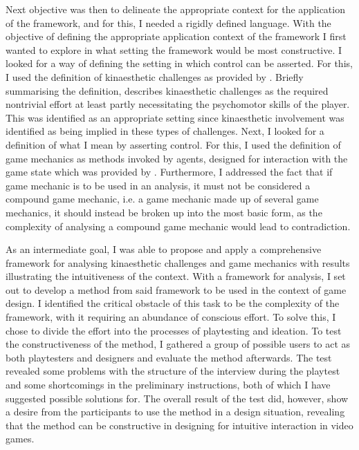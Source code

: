 Next objective was then to delineate the appropriate context for the application of the framework, and for this, I needed a rigidly defined language. With the objective of defining the appropriate application context of the framework I first wanted to explore in what setting the framework would be most constructive. I looked for a way of defining the setting in which control can be asserted. For this, I used the definition of kinaesthetic challenges as provided by . Briefly summarising the definition,  describes kinaesthetic challenges as the required nontrivial effort at least partly necessitating the psychomotor skills of the player. This was identified as an appropriate setting since kinaesthetic involvement was identified as being implied in these types of challenges. Next, I looked for a definition of what I mean by asserting control. For this, I used the definition of game mechanics as methods invoked by agents, designed for interaction with the game state which was provided by . Furthermore, I addressed the fact that if game mechanic is to be used in an analysis, it must not be considered a compound game mechanic, i.e. a game mechanic made up of several game mechanics, it should instead be broken up into the most basic form, as the complexity of analysing a compound game mechanic would lead to contradiction.

As an intermediate goal, I was able to propose and apply a comprehensive framework for analysing kinaesthetic challenges and game mechanics with results illustrating the intuitiveness of the context. With a framework for analysis, I set out to develop a method from said framework to be used in the context of game design. I identified the critical obstacle of this task to be the complexity of the framework, with it requiring an abundance of conscious effort. To solve this, I chose to divide the effort into the processes of playtesting and ideation. To test the constructiveness of the method, I gathered a group of possible users to act as both playtesters and designers and evaluate the method afterwards. The test revealed some problems with the structure of the interview during the playtest and some shortcomings in the preliminary instructions, both of which I have suggested possible solutions for. The overall result of the test did, however, show a desire from the participants to use the method in a design situation, revealing that the method can be constructive in designing for intuitive interaction in video games.

